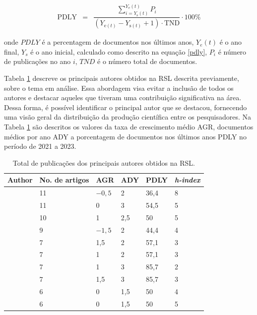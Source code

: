 \begin{eqnarray}
	\mathrm{PDLY}&=&\dfrac{\sum_{i={Y_{\mathrm{s}}(t)}}^{Y_{\mathrm{e}}(t)} P_i}{\left(Y_{\mathrm{e}(t)}-Y_{\mathrm{s}(t)}+1\right) \cdot \mathrm{TND}} \cdot 100 \%\label{pdly}
\end{eqnarray}

\noindent onde $PDLY$ é a percentagem de documentos nos últimos anos, $Y_e(t)$ é o ano final, $Y_s$ é o ano inicial, calculado como descrito na equação \eqref{pdly}, $P_i$ é número de publicações no ano $i$, $TND$ é o número total de documentos.

Tabela \ref{tb:autor} descreve os principais autores obtidos na RSL descrita previamente, sobre o tema em análise. Essa abordagem visa evitar a inclusão de todos os autores e destacar aqueles que tiveram uma contribuição significativa na área. Dessa forma, é possível identificar o principal autor que se destacou, fornecendo uma visão geral da distribuição da produção científica entre os pesquisadores. Na Tabela \ref{tb:autor} são descritos os valores da taxa de crescimento médio AGR, documentos médios por ano ADY a porcentagem de documentos nos últimos anos PDLY no período de 2021 a 2023.

\begin{table}[!htb]
	\centering
	\caption{Total de publicações dos principais autores obtidos na RSL.}\label{tb:autor}
	\begin{tabular}{llllll}
		\hline
		Author & No. de artigos & AGR & ADY & PDLY & \textit{h-index} \\
		\hline
		\citeonline{2-s2.0-84973369468} & 11 & $-0,5$ & 2 & 36,4 & 8 \\
		\citeonline{2-s2.0-85123707840} & 11 & 0 & 3 & 54,5 & 5 \\
		\citeonline{2-s2.0-85018469706} & 10 & 1 & 2,5 & 50 & 5 \\
		\citeonline{2-s2.0-85048003524} & 9 & $-1,5$ & 2 & 44,4 & 4 \\
		\citeonline{2-s2.0-84964575877} & 7 & 1,5 & 2 & 57,1 & 3 \\
		\citeonline{2-s2.0-85063200888} & 7 & 1 & 2 & 57,1 & 3 \\
		\citeonline{2-s2.0-85148656225} & 7 & 1 & 3 & 85,7 & 2 \\
		\citeonline{2-s2.0-85041536076} & 7 & 1,5 & 3 & 85,7 & 3 \\
		\citeonline{2-s2.0-85130875471} & 6 & 0 & 1,5 & 50 & 4 \\
		\citeonline{2-s2.0-85061810603} & 6 & 0 & 1,5 & 50 & 5 \\
		\hline
	\end{tabular}
\end{table}



